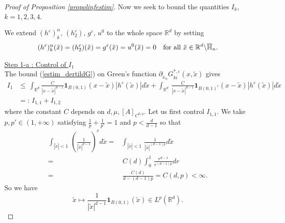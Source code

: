 \documentclass[11pt, reqno]{amsart}
\theoremstyle{definition}
\theoremstyle{remark}
\numberwithin{equation}{section}
\newcommand{\bs}{\symbol{92}}
\begin{document}
\begin{proof}[Proof of Proposition \textup{\ref{propolinfestim}}]
		\noindent Now we seek to bound the quantities $I_k$,  $k=1,2,3,4.$
		
		\noindent	We  extend  $  (h^\varepsilon)^\alpha_k,\, (h_2^\varepsilon),\, g^\varepsilon,
		\,    u^0  $ to the whole space $\mathbb{R}^d$ by setting 
		\begin{align*}
			(h^\varepsilon)^\alpha_k(\tilde{x})= (h_2^\varepsilon)(\tilde{x})= g^\varepsilon(\tilde{x})=  u^0 (\tilde{x}) =0 \quad \mbox{for all } \tilde{x}\in\mathbb{R}^d \bs \overline{\mathbb{H}}_n.
		\end{align*}	
		
		
		
		\noindent 	\underline{Step 1-a :	Control of  $I_1$}\\
		The bound (\ref{estim_dertildG}) on  Green's function $\partial_{\tilde{x}_\alpha} G_{ki}^{*,\varepsilon} (x,\tilde{x})$ gives
		\begin{align*}
			I_1&\leq  \,\!\int_{\mathbb{R}^d} \frac{C}{|x- \tilde{x}|^{d-1}} \mathbf{1}_{B(0,1)} (x- \tilde{x}) |h^\varepsilon(\tilde{x})| d\tilde{x}
			+   \int_{\mathbb{R}^d} \,  \frac{C}{|x- \tilde{x}|^{d-1}}   \mathbf{1}_{B(0,1)^c} (x- \tilde{x})|h^\varepsilon(\tilde{x}) |  d\tilde{x}\\
			&=: \, I_{1,1} + I_{1,2}
		\end{align*}
		where the constant $C$ depends on $d,\mu, [A]_{C^{0,\eta}}$.
		Let us first control $I_{1,1}$. We take $p,p'\in(1,+\infty)$ satisfying $\frac{1}{p}+\frac{1}{p'}=1$ and $p<\frac{d}{d-1}$ so that
		\begin{align*}
			\int_{| \tilde{x}|<1}\, \left( \frac{1}{|\tilde{x}|^{d-1}}  \right)^{\!\!^p} \! d\tilde{x}			=&  \int_{| \tilde{x}|<1} \,  \frac{1}{| \tilde{x}|^{(d-1)p}}  d\tilde{x}\\
			=&\, C(d) \int_0^1 \,  \frac{r^{d-1}}{r^{(d-1)p}}  dr\\	
			=&  \, \frac{C(d)}{d-(d-1)p} =C(d,p)<\infty.
		\end{align*}	
		So we have
		$$\tilde{x}\mapsto  \frac{1}{|\tilde{x}|^{d-1}}\mathbf{1}_{B(0,1)} (\tilde{x})\in L^p(\mathbb{R}^d).$$ 
		

\end{proof}
\end{document}
